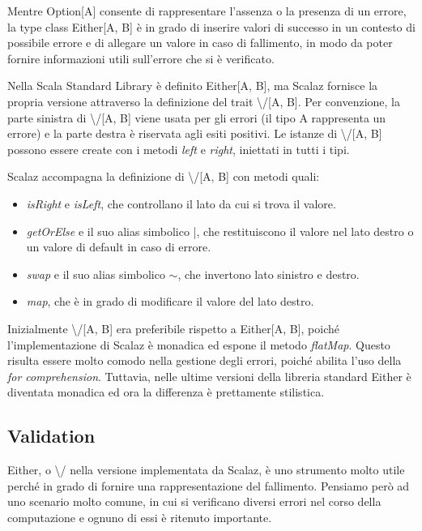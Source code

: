 Mentre Option[A] consente di rappresentare l'assenza o la presenza di un errore, la type class Either[A, B] è in grado di inserire valori di successo in un contesto di possibile errore e di allegare un valore in caso di fallimento, in modo da poter fornire informazioni utili sull'errore che si è verificato.

Nella Scala Standard Library è definito Either[A, B], ma Scalaz fornisce la propria versione attraverso la definizione del trait \textbackslash/[A, B]. Per convenzione, la parte sinistra di \textbackslash/[A, B] viene usata per gli errori (il tipo A rappresenta un errore) e la parte destra è riservata agli esiti positivi. Le istanze di \textbackslash/[A, B] possono essere create con i metodi \textit{left} e \textit{right}, iniettati in tutti i tipi.

Scalaz accompagna la definizione di \textbackslash/[A, B] con metodi quali:

\begin{itemize}
\item \textit{isRight} e \textit{isLeft}, che controllano il lato da cui si trova il valore.
\item \textit{getOrElse} e il suo alias simbolico |, che restituiscono il valore nel lato destro o un valore di default in caso di errore.
\item \textit{swap} e il suo alias simbolico $\sim$, che invertono lato sinistro e destro.
\item \textit{map}, che è in grado di modificare il valore del lato destro.
\end{itemize}

Inizialmente \textbackslash/[A, B] era preferibile rispetto a Either[A, B], poiché l'implementazione di Scalaz è monadica ed espone il metodo \textit{flatMap}. Questo risulta essere molto comodo nella gestione degli errori, poiché abilita l'uso della \textit{for comprehension}. Tuttavia, nelle ultime versioni della libreria standard Either è diventata monadica ed ora la differenza è prettamente stilistica.



\subsection{Validation}

Either, o \textbackslash/ nella versione implementata da Scalaz, è uno strumento molto utile perché in grado di fornire una rappresentazione del fallimento. Pensiamo però ad uno scenario molto comune, in cui si verificano diversi errori nel corso della computazione e ognuno di essi è ritenuto importante.

